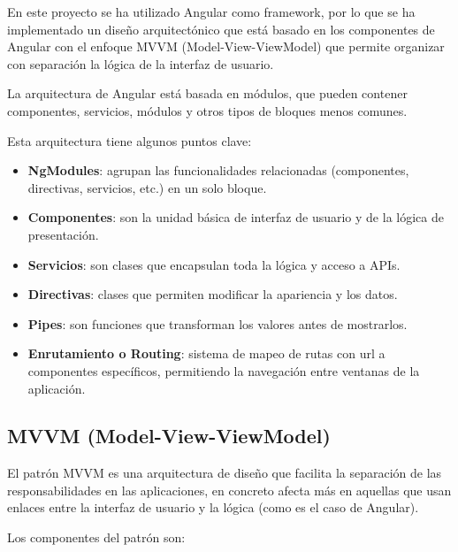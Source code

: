 En este proyecto se ha utilizado Angular como framework, por lo que se ha implementado un diseño arquitectónico que está basado en los componentes de Angular con el enfoque MVVM (Model-View-ViewModel) que permite organizar con separación la lógica de la interfaz de usuario.

La arquitectura de Angular está basada en módulos, que pueden contener componentes, servicios, módulos y otros tipos de bloques menos comunes.

Esta arquitectura tiene algunos puntos clave:

\begin{itemize}
\tightlist
\item
  \textbf{NgModules}: agrupan las funcionalidades relacionadas (componentes, directivas, servicios, etc.) en un solo bloque.
\item
  \textbf{Componentes}: son la unidad básica de interfaz de usuario y de la lógica de presentación.
\item
  \textbf{Servicios}: son clases que encapsulan toda la lógica y acceso a APIs.
\item
  \textbf{Directivas}: clases que permiten modificar la apariencia y los datos.
\item
  \textbf{Pipes}: son funciones que transforman los valores antes de mostrarlos.
\item
  \textbf{Enrutamiento o Routing}: sistema de mapeo  de rutas con url a componentes específicos, permitiendo la navegación entre ventanas de la aplicación.
\end{itemize}

\subsection{MVVM (Model-View-ViewModel)}

El patrón MVVM es una arquitectura de diseño que facilita la separación de las responsabilidades en las aplicaciones, en concreto afecta más en aquellas que usan enlaces entre la interfaz de usuario y la lógica (como es el caso de Angular). \cite{web:mvvm}

Los componentes del patrón son:

